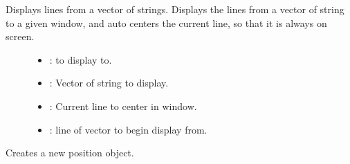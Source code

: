 \documentclass[letterpaper,10pt,english]{sphinxmanual}
\begin{document}
\begin{fulllineitems}
\begin{fulllineitems}
\label{\detokenize{index:_CPPv2N7ostendo12DisplayLinesEN7ostendo6WindowENSt6vectorINSt6stringEEEiRi}}%
\pysigstartmultiline
{}\label{\detokenize{index:Pessumnamespaceostendo_1a9bb1a56540aa7a03b6e8af5a347950d2}}%
\pysigstopmultiline
Displays lines from a vector of strings. Displays the lines from a vector of string to a given window, and auto centers the current line, so that it is always on screen. \begin{description}
\item[{}] \leavevmode
{\hyperref[\detokenize{index:Pessumclassostendo_1_1Window}]{}} 

\item[{}] \leavevmode\begin{itemize}
\item {} 
: {\hyperref[\detokenize{index:Pessumclassostendo_1_1Window}]{}} to display to. 

\item {} 
: Vector of string to display. 

\item {} 
: Current line to center in window. 

\item {} 
: line of vector to begin display from. 

\end{itemize}

\end{description}


\end{fulllineitems}


\begin{fulllineitems}
\label{\detokenize{index:_CPPv2N7ostendo8make_posEiiii}}%
\pysigstartmultiline
{}\label{\detokenize{index:Pessumnamespaceostendo_1a5703ea1e4f426c0216fc7f36708a4539}}%
\pysigstopmultiline
Creates a new position object. 


\end{fulllineitems}
\end{fulllineitems}
\end{document}
